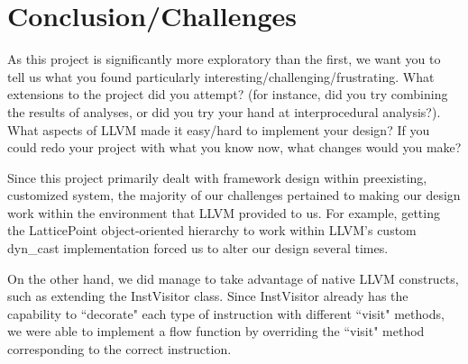 \documentclass{article}
\theoremstyle{definition}
\begin{document}


\section{Conclusion/Challenges}
\begin{framed}
  As this project is significantly more exploratory than the first, we
  want you to tell us what you found particularly
  interesting/challenging/frustrating. What extensions to the project
  did you attempt? (for instance, did you try combining the results of
  analyses, or did you try your hand at interprocedural
  analysis?). What aspects of LLVM made it easy/hard to implement your
  design? If you could redo your project with what you know now, what
  changes would you make?
\end{framed}

Since this project primarily dealt with framework design within preexisting, customized system, the majority of our challenges pertained to making our design work within the environment that LLVM provided to us. For example, getting the LatticePoint object-oriented hierarchy to work within LLVM's custom dyn\_cast implementation forced us to alter our design several times.

On the other hand, we did manage to take advantage of native LLVM constructs, such as extending the InstVisitor class. Since InstVisitor already has the capability to ``decorate" each type of instruction with different ``visit" methods, we were able to implement a flow function by overriding the ``visit" method corresponding to the correct instruction. 
\end{document}
